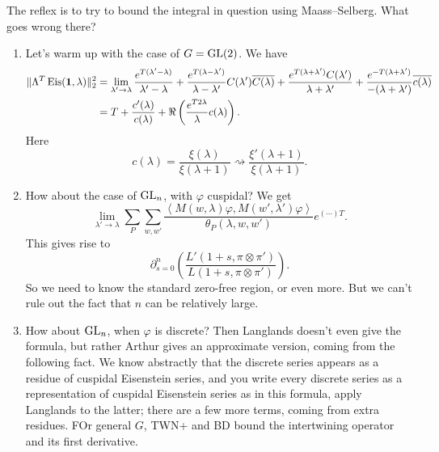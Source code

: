 \documentclass[reqno]{amsart} 
\begin{document}
The reflex is to try to bound the integral in question using Maass--Selberg.  What goes wrong there?
\begin{enumerate}
\item 
Let's warm up with the case of $G = \operatorname{GL}(2)$.  We have
\begin{align*}
  \lVert \Lambda^T \operatorname{Eis} (\mathbf{1}, \lambda ) \rVert_2^2
  &=
  \lim_{\lambda ' \rightarrow \lambda }
  \frac{e^{T (\lambda ' - \lambda )}}{\lambda ' - \lambda }
  +
  \frac{e^{T (\lambda - \lambda ')}}{\lambda - \lambda '}
  C (\lambda ') \overline{C (\lambda) }
  +
  \frac{e^{T (\lambda + \lambda ')} C(\lambda ')}{\lambda + \lambda '}
  +
  \frac{e^{- T (\lambda + \lambda ')}}{- (\lambda + \lambda ')}
  \overline{c (\lambda)}  \\
  &= T + \frac{c' (\lambda) }{c (\lambda) }
    + \Re \left( \frac{e^{T 2 \lambda }}{ \lambda } c (\lambda) \right).
\end{align*}
Here
\begin{equation*}
  c (\lambda)  =  \frac{\xi (\lambda) }{\xi (\lambda + 1)}
  \rightsquigarrow
  \frac{\xi ' (\lambda + 1)}{\xi (\lambda + 1)}.
\end{equation*}
\item How about the case of $\operatorname{GL}_n$, with $\varphi$ cuspidal?  We get
  \begin{equation*}
    \lim_{\lambda ' \rightarrow \lambda }
    \sum_P \sum_{w, w'}
    \frac{\left\langle M (w, \lambda ) \varphi, M (w ' , \lambda ' ) \varphi  \right\rangle}{
      \theta_P (\lambda, w, w')
    }
    e^{(\dotsb) T}.
  \end{equation*}
  This gives rise to
  \begin{equation*}
    \partial_{s = 0}^{n}
    \left(
      \frac{L ' (1 + s, \pi \otimes \pi ')}{L (1 + s, \pi \otimes \pi ')}
    \right).
  \end{equation*}
  So we need to know the standard zero-free region, or even more.  But we can't rule out the fact that $n$ can be relatively large.
\item How about $\operatorname{GL}_n$, when $\varphi$ is discrete?  Then Langlands doesn't even give the formula, but rather Arthur gives an approximate version, coming from the following fact.  We know abstractly that the discrete series appears as a residue of cuspidal Eisenstein series, and you write every discrete series as a representation of cuspidal Eisenstein series as in this formula, apply Langlands to the latter; there are a few more terms, coming from extra residues.  FOr general $G$, TWN+ and BD bound the intertwining operator and its first derivative.
\end{enumerate}
\end{document}
